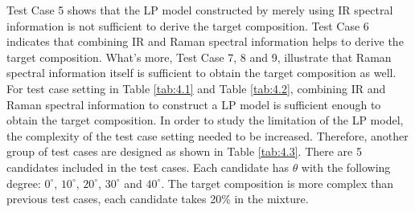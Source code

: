 \begin{table} \tiny 
{}
\caption{Test case 5 to 9 setting for methionine candidates}
\label{tab:4.2}
\end{table}	

Test Case 5 shows that the LP model constructed by merely using IR spectral information is not sufficient to derive the target composition. Test Case 6 indicates that combining IR and Raman spectral information helps to derive the target composition. What's more, Test Case 7, 8 and 9, illustrate that Raman spectral information itself is sufficient to obtain the target composition as well. \\

For test case setting in Table \ref{tab:4.1} and Table \ref{tab:4.2}, combining IR and Raman spectral information to construct a LP model is sufficient enough to obtain the target composition. In order to study the limitation of the LP model, the complexity of the test case setting needed to be increased. Therefore, another group of test cases are designed as shown in Table \ref{tab:4.3}. There are 5 candidates included in the test cases. Each candidate has $\theta$ with the following degree: $0^{\circ}$, $10^{\circ}$, $20^{\circ}$, $30^{\circ}$ and $40^{\circ}$. The target composition is more complex than previous test cases, each candidate takes 20\% in the mixture. \\

